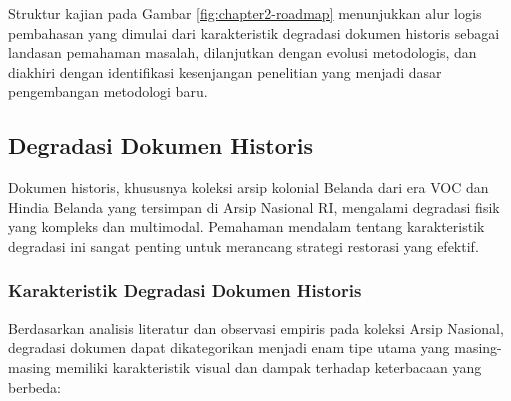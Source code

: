 Struktur kajian pada Gambar \ref{fig:chapter2-roadmap} menunjukkan alur logis pembahasan yang dimulai dari karakteristik degradasi dokumen historis sebagai landasan pemahaman masalah, dilanjutkan dengan evolusi metodologis, dan diakhiri dengan identifikasi kesenjangan penelitian yang menjadi dasar pengembangan metodologi baru.

\subsection{Degradasi Dokumen Historis}
\label{subsec:degradasi-dokumen}

Dokumen historis, khususnya koleksi arsip kolonial Belanda dari era VOC dan Hindia Belanda yang tersimpan di Arsip Nasional RI, mengalami degradasi fisik yang kompleks dan multimodal. Pemahaman mendalam tentang karakteristik degradasi ini sangat penting untuk merancang strategi restorasi yang efektif.

\subsubsection{Karakteristik Degradasi Dokumen Historis}
\label{subsubsec:karakteristik-degradasi}

Berdasarkan analisis literatur dan observasi empiris pada koleksi Arsip Nasional, degradasi dokumen dapat dikategorikan menjadi enam tipe utama yang masing-masing memiliki karakteristik visual dan dampak terhadap keterbacaan yang berbeda:

